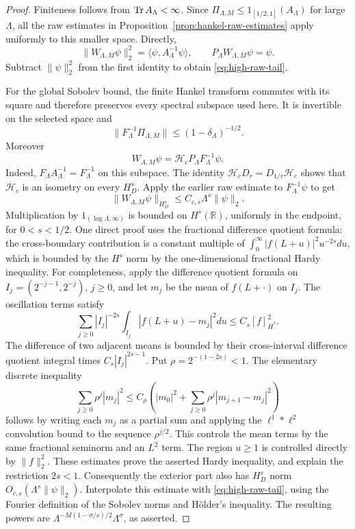 \begin{proof}
Finiteness follows from $\operatorname{Tr} A_\Lambda<\infty$. Since
$\Pi_{\Lambda,M}\leq1_{[1/2,1]}(A_\Lambda)$ for large $\Lambda$,
all the raw estimates in
Proposition~\ref{prop:hankel-raw-estimates} apply uniformly to this
smaller space. Directly,
\[
 \|W_{\Lambda,M}\psi\|_2^2
     =\langle\psi,A_\Lambda^{-1}\psi\rangle,
 \qquad P_\Lambda W_{\Lambda,M}\psi=\psi.
\]
Subtract $\|\psi\|_2^2$ from the first identity to obtain
\eqref{eq:high-raw-tail}.

For the global Sobolev bound, the finite Hankel transform commutes
with its square and therefore preserves every spectral subspace
used here. It is invertible on the selected space and
\[
 \|F_\Lambda^{-1}\Pi_{\Lambda,M}\|
                       \leq(1-\delta_\Lambda)^{-1/2}.
\]
Moreover
\begin{equation}
 \label{eq:high-extension-hankel}
 W_{\Lambda,M}\psi
            =\mathcal H_cP_\Lambda F_\Lambda^{-1}\psi.
\end{equation}
Indeed, $F_\Lambda A_\Lambda^{-1}=F_\Lambda^{-1}$ on this
subspace. The identity
$\mathcal H_cD_r=D_{1/r}\mathcal H_c$ shows that $\mathcal H_c$
is an isometry on every $H_D^s$. Apply the earlier raw estimate
to $F_\Lambda^{-1}\psi$ to get
\[
 \|W_{\Lambda,M}\psi\|_{H_D^s}
                         \leq C_{c,s}\Lambda^s\|\psi\|_2.
\]
Multiplication by $1_{(\log\Lambda,\infty)}$ is bounded on
$H^s(\mathbb R)$, uniformly in the endpoint, for $0<s<1/2$.
One direct proof uses the fractional difference quotient formula:
the cross-boundary contribution is a constant multiple of
$\int_0^\infty |f(L+u)|^2u^{-2s}du$, which is bounded by the
$H^s$ norm by the one-dimensional fractional Hardy inequality.
For completeness, apply the difference quotient formula on
$I_j=(2^{-j-1},2^{-j})$, $j\geq0$, and let $m_j$ be the mean
of $f(L+\cdot)$ on $I_j$. The oscillation terms satisfy
\[
 \sum_{j\geq0}|I_j|^{-2s}
       \int_{I_j}|f(L+u)-m_j|^2du
                    \leq C_s[f]_{\dot H^s}^2.
\]
The difference of two adjacent means is bounded by their
cross-interval difference quotient integral times
$C_s|I_j|^{2s-1}$. Put $\rho=2^{-(1-2s)}<1$.
The elementary discrete inequality
\[
 \sum_{j\geq0}\rho^j|m_j|^2
 \leq C_\rho\left(|m_0|^2+
                \sum_{j\geq0}\rho^j|m_{j+1}-m_j|^2\right)
\]
follows by writing each $m_j$ as a partial sum and applying
the $\ell^1*\ell^2$ convolution bound to the sequence
$\rho^{j/2}$. This controls the mean terms by the same
fractional seminorm and an $L^2$ term. The region $u\geq1$
is controlled directly by $\|f\|_2^2$. These estimates prove
the asserted Hardy inequality, and explain the restriction
$2s<1$.
Consequently the exterior part also has $H_D^s$ norm
$O_{c,s}(\Lambda^s\|\psi\|_2)$. Interpolate this estimate with
\eqref{eq:high-raw-tail}, using the Fourier definition of the
Sobolev norms and H\"older's inequality. The resulting powers are
$\Lambda^{-M(1-\sigma/s)/2}\Lambda^\sigma$, as asserted.


\end{proof}
